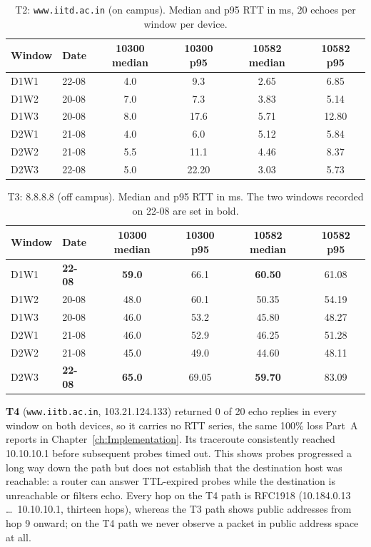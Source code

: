 \begin{table}[H]
\centering
\caption{T2: \texttt{www.iitd.ac.in} (on campus). Median and p95 RTT in ms, 20 echoes per
window per device.}
\label{tab:b1t2}
\footnotesize
\begin{tabular}{@{}llcccc@{}}
\toprule
Window & Date & 10300 median & 10300 p95 & 10582 median & 10582 p95 \\
\midrule
D1W1 & 22-08 & 4.0 & 9.3 & 2.65 & 6.85 \\
D1W2 & 20-08 & 7.0 & 7.3 & 3.83 & 5.14 \\
D1W3 & 20-08 & 8.0 & 17.6 & 5.71 & 12.80 \\
D2W1 & 21-08 & 4.0 & 6.0 & 5.12 & 5.84 \\
D2W2 & 21-08 & 5.5 & 11.1 & 4.46 & 8.37 \\
D2W3 & 22-08 & 5.0 & 22.20 & 3.03 & 5.73 \\
\bottomrule
\end{tabular}
\end{table}

\begin{table}[H]
\centering
\caption{T3: 8.8.8.8 (off campus). Median and p95 RTT in ms. The two windows recorded on
22-08 are set in bold.}
\label{tab:b1t3}
\footnotesize
\begin{tabular}{@{}llcccc@{}}
\toprule
Window & Date & 10300 median & 10300 p95 & 10582 median & 10582 p95 \\
\midrule
D1W1 & \textbf{22-08} & \textbf{59.0} & 66.1 & \textbf{60.50} & 61.08 \\
D1W2 & 20-08 & 48.0 & 60.1 & 50.35 & 54.19 \\
D1W3 & 20-08 & 46.0 & 53.2 & 45.80 & 48.27 \\
D2W1 & 21-08 & 46.0 & 52.9 & 46.25 & 51.28 \\
D2W2 & 21-08 & 45.0 & 49.0 & 44.60 & 48.11 \\
D2W3 & \textbf{22-08} & \textbf{65.0} & 69.05 & \textbf{59.70} & 83.09 \\
\bottomrule
\end{tabular}
\end{table}

\textbf{T4} (\texttt{www.iitb.ac.in}, 103.21.124.133) returned 0 of 20 echo replies in every
window on both devices, so it carries no RTT series, the same 100\% loss Part~A reports in
Chapter~\ref{ch:Implementation}. Its traceroute consistently reached 10.10.10.1 before subsequent
probes timed out. This shows probes progressed a long way down the path but does not establish
that the destination host was reachable: a router can answer TTL-expired probes while the
destination is unreachable or filters echo. Every hop on the T4 path is RFC1918
(10.184.0.13 \ldots\ 10.10.10.1, thirteen hops), whereas the T3 path shows public addresses from
hop 9 onward; on the T4 path we never observe a packet in public address space at all.

